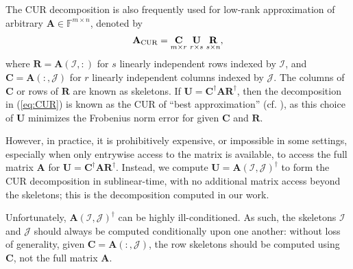 \documentclass[11pt]{article}
\newcommand{\npnote}[1]{\textit{\textcolor{cyan}{NP: #1}}}
\newcommand{\llnote}[1]{\textit{\textcolor{olive}{LL: #1}}}
\newcommand{\curX}{\mathbf{A}_{\textup{CUR}}}
\newcommand{\F}{\mathbb{F}}
\begin{document}
The CUR decomposition is also frequently used for low-rank approximation of arbitrary $\mathbf{A} \in \F^{m \times n}$, denoted by
\begin{align}
    \label{eq:CUR}
    \curX = \underset{m \times r}{\mathbf{C}} \underset{r \times s}{\hspace{2mm} \mathbf{U} \hspace{2mm}} \underset{s \times n}{\mathbf{R}},
\end{align}
where $\mathbf{R} = \mathbf{A}(\mathcal{I},:)$ for $s$ linearly independent rows indexed by $\mathcal{I}$, and $\mathbf{C} = \mathbf{A}(:,\mathcal{J})$ for $r$ linearly independent columns indexed by $\mathcal{J}$.
The columns of $\mathbf{C}$ or rows of $\mathbf{R}$ are known as skeletons.
If $\mathbf{U} = \mathbf{C}^\dag \mathbf{A} \mathbf{R}^\dag$, then the decomposition in (\ref{eq:CUR}) is known as the CUR of ``best approximation'' (cf. \cite{ParkNakatsukasa25}), as this choice of $\mathbf{U}$ minimizes the Frobenius norm error for given $\mathbf{C}$ and $\mathbf{R}$.

However, in practice, it is prohibitively expensive, or impossible in some settings, especially when only entrywise access to the matrix is available, to access the full matrix $\mathbf{A}$ for  $\mathbf{U} = \mathbf{C}^\dag \mathbf{A} \mathbf{R}^\dag$.
Instead, we compute $\mathbf{U} = \mathbf{A}(\mathcal{I},\mathcal{J})^\dag$ to form the CUR decomposition in sublinear-time, with no additional matrix access beyond the skeletons; this is the decomposition computed in our work.

Unfortunately, $\mathbf{A}(\mathcal{I},\mathcal{J})^{\dag}$ can be highly ill-conditioned.
As such, the skeletons $\mathcal{I}$ and $\mathcal{J}$ should always be computed conditionally upon one another:
without loss of generality, given $\mathbf{C} = \mathbf{A}(:,\mathcal{J})$, the row skeletons should be computed using $\mathbf{C}$, not the full matrix $\mathbf{A}$.
\end{document}

